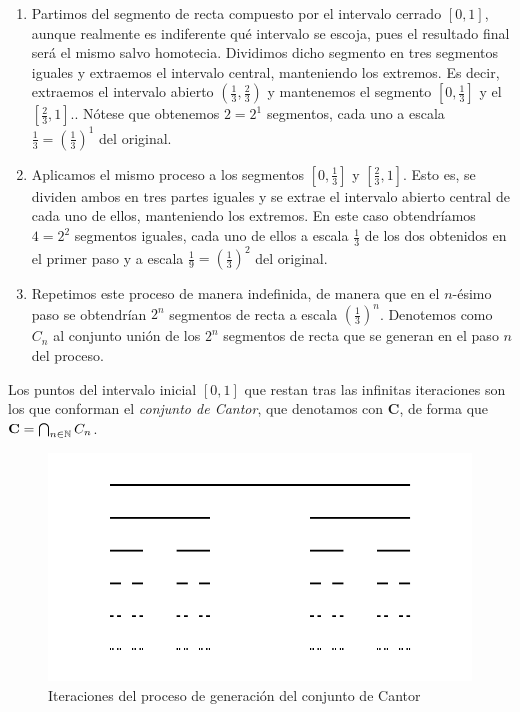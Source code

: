 \begin{enumerate}
\item Partimos del segmento de recta compuesto por el intervalo cerrado $[0,1]$, aunque realmente es indiferente qué intervalo se escoja, pues el resultado final será el mismo salvo homotecia. Dividimos dicho segmento en tres segmentos iguales y extraemos el intervalo central, manteniendo los extremos. Es decir, extraemos el intervalo abierto $\left(\frac 1 3, \frac 2 3\right)$ y mantenemos el segmento $\left[0,\frac 1 3\right]$ y el $\left[\frac 2 3, 1\right]$.. Nótese que obtenemos $2=2^1$ segmentos, cada uno a escala $\frac 1 3=\left(\frac 1 3\right)^1$ del original.

\item Aplicamos el mismo proceso a los segmentos $\left[0,\frac 1 3\right]$ y $\left[\frac 2 3, 1\right]$. Esto es, se dividen ambos en tres partes iguales y se extrae el intervalo abierto central de cada uno de ellos, manteniendo los extremos. En este caso obtendríamos $4=2^2$ segmentos iguales, cada uno de ellos a escala $\frac 1 3$ de los dos obtenidos en el primer paso y a escala $\frac 1 9=\left(\frac 1 3\right)^2$ del original.

\item Repetimos este proceso de manera indefinida, de manera que en el $n$-ésimo paso se obtendrían $2^n$ segmentos de recta a escala $\left(\frac 1 3\right)^n$. Denotemos como $C_n$ al conjunto unión de los $2^n$ segmentos de recta que se generan en el paso $n$ del proceso.
\end{enumerate} 

Los puntos del intervalo inicial $[0,1]$ que restan tras las infinitas iteraciones son los que conforman el \textit{conjunto de Cantor}, que denotamos con $\mathbf{C}$, de forma que $\mathbf{C}=\bigcap_{n\in\mathbb{N}}C_n$.

\begin{figure} [h]
\centering
\includegraphics[scale = 0.4]{img/cantor.png}
\caption{Iteraciones del proceso de generación del conjunto de Cantor}
 \label{fig:Cantor}
\end{figure}

